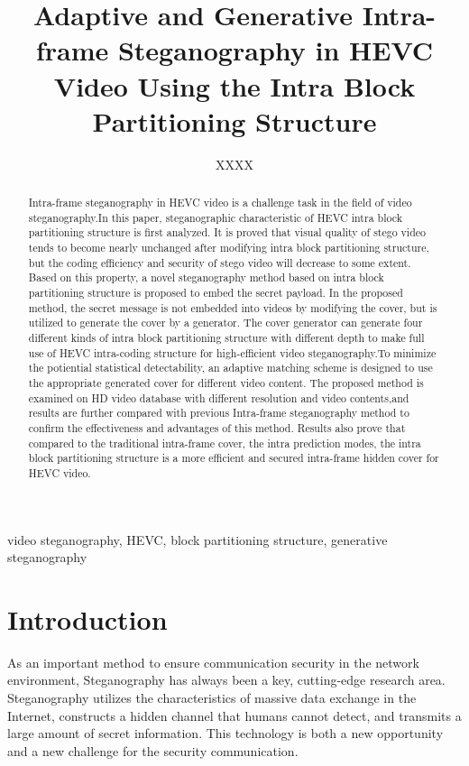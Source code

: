 \documentclass[journal,sort]{IEEEtran}
\begin{document}
\title{Adaptive and Generative Intra-frame Steganography in HEVC Video Using the Intra Block Partitioning Structure}
\author{XXXX}
	

\maketitle

\begin{abstract}
Intra-frame steganography in HEVC video is a challenge task in the field of video steganography.In this paper, steganographic characteristic of HEVC intra block partitioning structure is first analyzed. It is proved that visual quality of stego video tends to become nearly unchanged after modifying intra block partitioning structure, but the coding efficiency and security of stego video will decrease to some extent.
Based on this property, a novel steganography method based on intra block partitioning structure is proposed to embed the secret payload. In the proposed method, the secret message is not embedded into videos by modifying the cover, but is utilized to generate the cover by a generator. The cover generator can generate four different kinds of intra block partitioning structure with different depth to make full use of HEVC intra-coding structure for high-efficient video steganography.To minimize the potiential statistical detectability, an adaptive matching scheme is designed to use the appropriate generated cover for different video content.
The proposed method is examined on HD video database with different resolution and video contents,and results are further compared with previous Intra-frame steganography method to confirm the effectiveness and advantages of this method. Results also prove that compared to the traditional intra-frame cover, the intra prediction modes, the intra block partitioning structure is a more efficient and secured intra-frame hidden cover for HEVC video.


	
	
\end{abstract}	
\begin{IEEEkeywords}
		video steganography, HEVC, block partitioning structure, generative steganography
\end{IEEEkeywords}
	
\section{Introduction\label{intro}}

As an important method to ensure communication security in the network environment, Steganography has always been a key, cutting-edge research area. Steganography utilizes the characteristics of massive data exchange in the Internet, constructs a hidden channel that humans cannot detect, and transmits a large amount of secret information. This technology is both a new opportunity and a new challenge for the security communication.
\end{document}
